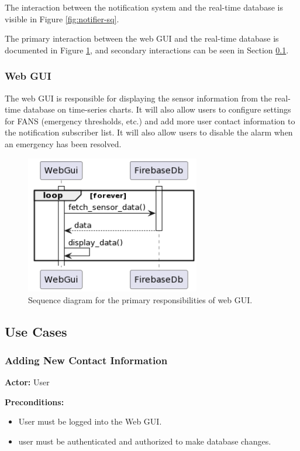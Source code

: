The interaction between the notification system and the real-time database is visible in Figure \ref{fig:notifier-sq}.

The primary interaction between the web GUI and the real-time database is documented in Figure \ref{fig:webui-sq}, and
secondary interactions can be seen in Section \ref{s:use-cases}.

\subsubsection{Web GUI}

The web GUI is responsible for displaying the sensor information from the real-time database on time-series charts. It
will also allow users to configure settings for FANS (emergency thresholds, etc.) and add more user contact information
to the notification subscriber list. It will also allow users to disable the alarm when an emergency has been resolved.

\begin{figure}[H]
    \centering
    \includegraphics[width=3in]{../assets/WebGUiSequence.png}
    \caption{Sequence diagram for the primary responsibilities of web GUI.}
    \label{fig:webui-sq}
\end{figure}

\subsection{Use Cases} \label{s:use-cases}

\subsubsection{Adding New Contact Information}

\textbf{Actor:} User

\textbf{Preconditions:}
\begin{itemize}
    \item User must be logged into the Web GUI.
    \item user must be authenticated and authorized to make database changes.
\end{itemize}


